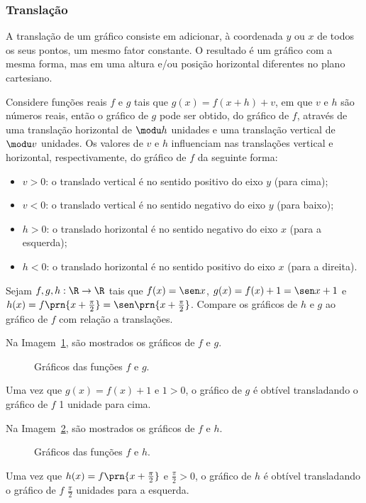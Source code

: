 \subsubsection{Translação}

A translação de um gráfico consiste em adicionar, à coordenada $y$ ou $x$ de todos os seus pontos, um mesmo fator constante.
O resultado é um gráfico com a mesma forma, mas em uma altura e/ou posição horizontal diferentes no plano cartesiano.

Considere funções reais $f$ e $g$ tais que $g(x) = f(x+h) + v$, em que $v$ e $h$ são números reais,
então o gráfico de $g$ pode ser obtido, do gráfico de $f$, através
de uma translação horizontal de $\modu h$ unidades e uma
translação vertical de $\modu v$ unidades.
Os valores de $v$ e $h$ influenciam nas translações vertical e horizontal, respectivamente, do gráfico de $f$ da seguinte forma:

\begin{itemize}
  \item $v > 0$: o translado vertical é no sentido positivo do eixo $y$ (para cima);
  \item $v < 0$: o translado vertical é no sentido negativo do eixo $y$ (para baixo);
  \item $h > 0$: o translado horizontal é no sentido negativo do eixo $x$ (para a esquerda);
  \item $h < 0$: o translado horizontal é no sentido positivo do eixo $x$ (para a direita).
\end{itemize}

\begin{example}
Sejam $f,g,h:\R \to \R$ tais que $f(x) = \sen x$, $g(x) = f(x) + 1 = \sen x +1$ e $h(x)= f\prn{x+\frac {\pi} 2}= \sen \prn{x+ \frac {\pi} 2}$.
Compare os gráficos de $h$ e $g$ ao gráfico de $f$ com relação a translações.
\end{example}

\begin{solution}
Na Imagem~\ref{img:grafico-translacao-exemplo-g}, são mostrados os gráficos de $f$ e $g$.
%
  \begin{figure}[H]
    \centering
    \caption{Gráficos das funções $f$ e $g$.}
    \label{img:grafico-translacao-exemplo-g}
  \end{figure}
%
\noindent Uma vez que $g(x) = f(x)+1$ e $1>0$, o gráfico de $g$ é obtível transladando o gráfico de $f$ 1 unidade para cima.

Na Imagem~\ref{img:grafico-translacao-exemplo-h}, são mostrados os gráficos de $f$ e $h$.
%
  \begin{figure}[H]
    \centering
    \caption{Gráficos das funções $f$ e $h$.}
    \label{img:grafico-translacao-exemplo-h}
  \end{figure}
%
\noindent Uma vez que $h(x) = f\prn{x+\frac {\pi} 2}$ e $\frac {\pi} 2>0$, o gráfico de $h$ é obtível transladando o gráfico de $f$ $\frac {\pi} 2$ unidades para a esquerda.
\end{solution}    